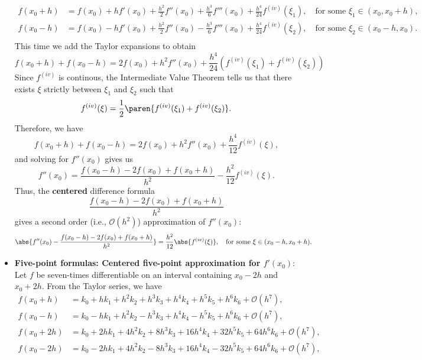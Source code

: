 \documentclass{report}
\begin{document}
\begin{itemize}
\begin{align*}
                f(x_0 + h) &= f(x_0) + hf'(x_0) + \frac{h^2}{2}f''(x_0) + \frac{h^3}{6}f'''(x_0) + \frac{h^4}{24} f^{(iv)}(\xi_1), \quad \text{for some $\xi_1 \in (x_0,x_0+h),$} \\
                f(x_0 - h) &= f(x_0) - hf'(x_0) + \frac{h^2}{2}f''(x_0) - \frac{h^3}{6}f'''(x_0) + \frac{h^4}{24} f^{(iv)}(\xi_2), \quad \text{for some $\xi_2 \in (x_0-h,x_0).$}\\
            \end{align*}
            This time we add the Taylor expansions to obtain
            $$
            f(x_0 + h) + f(x_0 - h) = 2f(x_0) + h^2f''(x_0) + \frac{h^4}{24} \left( f^{(iv)}(\xi_1) + f^{(iv)}(\xi_2) \right)
            $$
            \bigbreak \noindent 
            Since $f^{(iv)}$ is continous, the Intermediate Value Theorem tells us that there exists $\xi$ strictly between $\xi_1$ and $\xi_2$ such that
            $$f^{(iv)}(\xi) = \frac{1}{2}\paren{f^{(iv)}(\xi_1) + f^{(iv)}(\xi_2)}.$$
            Therefore, we have
            $$
            f(x_0 + h) + f(x_0 - h) = 2f(x_0) + h^2f''(x_0) + \frac{h^4}{12} f^{(iv)}(\xi),
            $$
            and solving for $f''(x_0)$ gives us
            $$f''(x_0) = \frac{f(x_0 - h) - 2f(x_0) + f(x_0 + h)}{h^2} - \frac{h^2}{12}f^{(iv)}(\xi).$$
            \bigbreak \noindent 
            Thus, the \textbf{centered} difference formula
            $$\displaystyle \frac{f(x_0 - h) - 2f(x_0) + f(x_0 + h)}{h^2}$$
            gives a second order (i.e., $\mathcal{O}(h^2)$) approximation of $f''(x_0)$:
            $$\abs{f''(x_0) -  \frac{f(x_0 - h) - 2f(x_0) + f(x_0 + h)}{h^2}} = \frac{h^2}{12}\abs{f^{(iv)}(\xi)}, \quad \text{for some $\xi \in (x_0-h,x_0+h).$}$$
        \item \textbf{Five-point formulas: Centered five-point approximation for $f'(x_0)$}:
            Let $f$ be seven-times differentiable on an interval containing $x_0-2h$ and $x_0 + 2h$. From the Taylor series, we have
            \begin{align*}
                f(x_0 + h) &= k_0 + hk_1 + h^2k_2 + h^3k_3 + h^4k_4 + h^5k_5 + h^6k_6 + \mathcal{O}(h^7), \\ 
                f(x_0 - h) &= k_0 - hk_1 + h^2k_2 - h^3k_3 + h^4k_4 - h^5k_5 + h^6k_6 + \mathcal{O}(h^7), \\
                f(x_0 + 2h) &= k_0 + 2hk_1 + 4h^2k_2 + 8h^3k_3 + 16h^4k_4 + 32h^5k_5 + 64h^6k_6 + \mathcal{O}(h^7), \\ 
                f(x_0 - 2h) &= k_0 - 2hk_1 + 4h^2k_2 - 8h^3k_3 + 16h^4k_4 - 32h^5k_5 + 64h^6k_6 + \mathcal{O}(h^7), \\

\end{align*}
\end{itemize}
\end{document}
